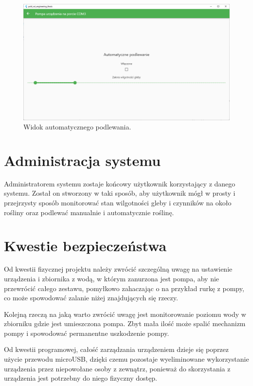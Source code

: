 \documentclass[a4paper,twoside,12pt]{book}
\begin{document}
\begin{figure}[H]
   \centering
   \includegraphics[width=\textwidth]{./assets/img/img018.png}
   \caption{Widok automatycznego podlewania.}
   \label{fig:18}
\end{figure}

\section{Administracja systemu}

Administratorem systemu zostaje końcowy użytkownik korzystający z danego systemu. Został on stworzony w taki sposób, aby użytkownik mógł w prosty i przejrzysty sposób monitorować stan wilgotności gleby i czynników na około rośliny oraz podlewać manualnie i automatycznie roślinę.

\section{Kwestie bezpieczeństwa}

Od kwestii fizycznej projektu należy zwrócić szczególną uwagę na ustawienie urządzenia i zbiornika z wodą, w którym zanurzona jest pompa, aby nie przewrócić całego zestawu, pomyłkowo zahaczając o na przykład rurkę z pompy, co może spowodować zalanie niżej znajdujących się rzeczy.

Kolejną rzeczą na jaką warto zwrócić uwagę jest monitorowanie poziomu wody w zbiorniku gdzie jest umieszczona pompa. Zbyt mała ilość może spalić mechanizm pompy i spowodować permanentne uszkodzenie pompy.

Od kwestii programowej, całość zarządzania urządzeniem dzieje się poprzez użycie przewodu microUSB, dzięki czemu pozostaje wyeliminowane wykorzystanie urządzenia przez niepowołane osoby z zewnątrz, ponieważ do skorzystania z urządzenia jest potrzebny do niego fizyczny dostęp.
\end{document}
